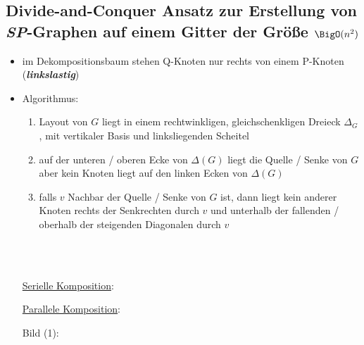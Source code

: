 \subsection{Divide-and-Conquer Ansatz zur Erstellung von \textit{SP}-Graphen auf einem Gitter der Größe $\BigO(n^2)$}
\begin{itemize}[itemsep=-1pt]
	\item im Dekompositionsbaum stehen Q-Knoten nur rechts von einem P-Knoten (\textit{\textbf{linkslastig}})
	\item Algorithmus:\\
		\begin{minipage}{0.3\textwidth}
			
		\end{minipage}
		\begin{minipage}{0.55\textwidth}
			\begin{enumerate}
				\item Layout von $G$ liegt in einem rechtwinkligen, gleichschenkligen Dreieck $\Delta_G$, mit vertikaler Basis und linksliegenden Scheitel
				\item auf der unteren / oberen Ecke von $\Delta(G)$ liegt die Quelle / Senke von $G$ aber kein Knoten liegt auf den linken Ecken von $\Delta(G)$
				\item falls $v$ Nachbar der Quelle / Senke von $G$ ist, dann liegt kein anderer Knoten rechts der Senkrechten durch $v$ und unterhalb der fallenden / oberhalb der steigenden Diagonalen durch $v$
			\end{enumerate}
		\end{minipage}\\
		\vspace*{\baselineskip}\\
		\begin{minipage}{0.3\textwidth}
			\underline{Serielle Komposition}:\\
			
		\end{minipage}
		\begin{minipage}{0.3\textwidth}
			\underline{Parallele Komposition}:\\
			
		\end{minipage}
		\begin{minipage}{0.3\textwidth}
			Bild (1):\\
			
		\end{minipage}\\
		\vspace*{\baselineskip}\\

\end{itemize}
